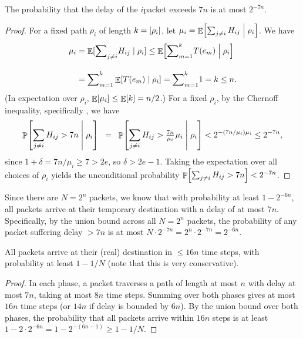 \begin{claim}
    The probability that the delay of the $i$\th packet exceeds $7n$ is
    at most $2^{-7n}$.
\end{claim}
\begin{proof}
    For a fixed path $\rho_i$ of length $k=\left| {\rho_i} \right|$, let
    $\mu_i = \mathop{\mathbb{E}}\!\left[ \sum_{j \neq i} H_{ij} \;\middle\vert\; \rho_i \right]$. We have
    \begin{align*}
        \mu_i
        &=
        \ExCond{ \smash{\sum\nolimits_{j \neq i}} H_{i j} }{\rho_i}
        \leq
        \ExCond{\Bigl. \smash{\sum\nolimits_{m=1}^{k}} T(e_m) }{\rho_i}
        \\[0.4cm]&%
        =
        {\sum\nolimits_{m=1}^{k}} \ExCond{T(e_m) }{\rho_i } 
        =
        {\sum\nolimits_{m=1}^{k}} 1
        =
        k \leq n.
    \end{align*}
    (In expectation over $\rho_i$, $\mathop{\mathbb{E}}\!\left[ {\mu_i} \right] \leq \mathop{\mathbb{E}}\!\left[ {k} \right] = n/2$.)
    For a fixed $\rho_i$, by the Chernoff inequality, specifically
    , we have
    \begin{equation*}
        \ProbCond{ \sum_{j \neq i} H_{i j} > 7n }{\rho_i}
        \EQ%
        \ProbCond{ \sum_{j \neq i} H_{i j} >
           \tfrac{7n}{\mu_i} \ts \mu_i }{\rho_i}
        <
        2^{-(7n/\mu_i)\mu_i}
        \leq
        2^{-7n},
    \end{equation*}
    since $1 + \delta = 7n/\mu_i \geq 7 > 2e$, so $\delta > 2e - 1$.
    Taking the expectation over all choices of $\rho_i$ yields the unconditional probability
    $\Prob{\sum_{j \neq i} H_{ij} > 7n} < 2^{-7n}$.
\end{proof}

Since there are $N = 2^n$ packets, we know that with probability at least
$1 - 2^{-6n}$, all packets arrive at their temporary destination with a
delay of at most $7n$.%
Specifically, by the union bound across all $N = 2^n$ packets, the
probability of any packet suffering delay $> 7n$ is at most
$N \cdot 2^{-7n} = 2^n \cdot 2^{-7n} = 2^{-6n}$.

\begin{theorem}
    All packets arrive at their (real) destination in $\leq 16n$ time steps,
    with probability at least $1 - 1/N$ (note that this is very
    conservative).
\end{theorem}
\begin{proof}
    In each phase, a packet traverses a path of length at most $n$ with
    delay at most $7n$, taking at most $8n$ time steps. Summing over both
    phases gives at most $16n$ time steps (or $14n$ if delay is bounded
    by $6n$). By the union bound over both phases, the probability that
    all packets arrive within $16n$ steps is at least
    $1 - 2 \cdot 2^{-6n} = 1 - 2^{-(6n-1)} \geq 1 - 1/N$.
\end{proof}

